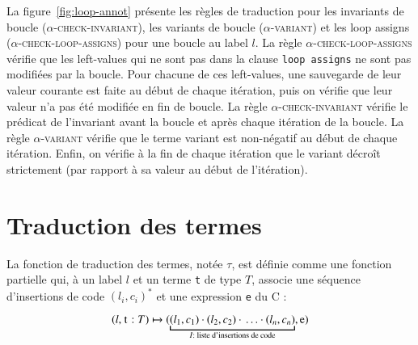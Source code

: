 

La figure~\ref{fig:loop-annot} présente les règles de traduction pour les
invariants de boucle (\textsc{$\alpha$-check-invariant}), les variants de boucle
(\textsc{$\alpha$-variant}) et les loop assigns
(\textsc{$\alpha$-check-loop-assigns}) pour une boucle au label $l$.
La règle \textsc{$\alpha$-check-loop-assigns} vérifie que les left-values qui ne
sont pas dans la clause \lstinline'loop assigns' ne sont pas modifiées par la
boucle.
Pour chacune de ces left-values, une sauvegarde de leur valeur courante est
faite au début de chaque itération, puis on vérifie que leur valeur n'a pas été
modifiée en fin de boucle.
La règle \textsc{$\alpha$-check-invariant} vérifie le prédicat de l'invariant
avant la boucle et après chaque itération de la boucle.
La règle \textsc{$\alpha$-variant} vérifie que le terme variant est non-négatif
au début de chaque itération.
Enfin, on vérifie à la fin de chaque itération que le variant décroît
strictement (par rapport à sa valeur au début de l'itération).



\section{Traduction des termes \eacsl}
\label{sec:term}


La fonction de traduction des termes, notée $\tau$, est définie comme une
fonction partielle qui, à un label $l$ et un terme \lstinline't' de type $T$,
associe une séquence d'insertions de code $(l_i, c_i)^*$ et une expression
\lstinline'e' du C :

\[
(l, \mbox{\lstinline't'}:T) \rulearrow
(\underbracket{(l_1, c_1) \concat (l_2, c_2) \concat \ldots
  \concat (l_n, c_n)}_{I : \text{ liste d'insertions de code}}, \mbox{\lstinline'e'})
\]

